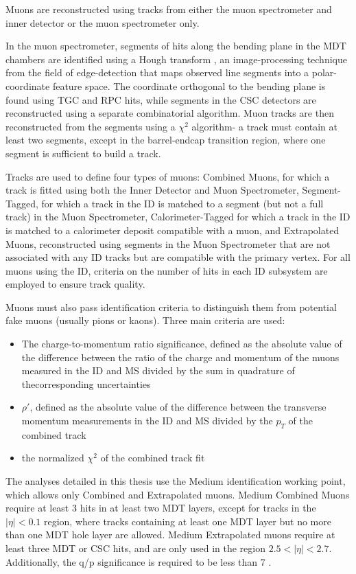 Muons are reconstructed using tracks from either the muon spectrometer and inner detector or the muon spectrometer only.

In the muon spectrometer, segments of hits along the bending plane in the MDT chambers are identified using a Hough transform \cite{Hough}, an image-processing technique from the field of edge-detection that maps observed line segments into a polar-coordinate feature space. The coordinate orthogonal to the bending plane is found using TGC and RPC hits, while segments in the CSC detectors are reconstructed using a separate combinatorial algorithm. Muon tracks are then reconstructed from the segments using a $\chi^{2}$ algorithm- a track must contain at least two segments, except in the barrel-endcap transition region, where one segment is sufficient to build a track. 

Tracks are used to define four types of muons: Combined Muons, for which a track is fitted using both the Inner Detector and Muon Spectrometer, Segment-Tagged, for which a track in the ID is matched to a segment (but not a full track) in the Muon Spectrometer, Calorimeter-Tagged for which a track in the ID is matched to a calorimeter deposit compatible with a muon, and Extrapolated Muons, reconstructed using segments in the Muon Spectrometer that are not associated with any ID tracks but are compatible with the primary vertex. For all muons using the ID, criteria on the number of hits in each ID subsystem are employed to ensure track quality.

Muons must also pass identification criteria to distinguish them from potential fake muons (usually pions or kaons). Three main criteria are used:

\begin{itemize}
\item The charge-to-momentum ratio significance, defined as the absolute value of the difference between the ratio of the charge and momentum of the muons measured in the ID and MS divided by the sum in quadrature of thecorresponding uncertainties
\item $\rho'$, defined as the absolute value of the difference between the transverse momentum measurements in the ID and MS divided by the $p_{T}$ of the combined track
\item the normalized $\chi^{2}$ of the combined track fit
\end{itemize}

The analyses detailed in this thesis use the Medium identification working point, which allows only Combined and Extrapolated muons. Medium Combined Muons require at least 3 hits in at least two MDT layers, except for tracks in the $|\eta| <0.1$ region, where tracks containing at least one MDT layer but no more than one MDT hole layer are allowed. Medium Extrapolated muons require at least three MDT or CSC hits, and are only used in the region $2.5 < |\eta| < 2.7$. Additionally, the q/p significance is required to be less than 7 \cite{CERN-EP-2016-033}. 

